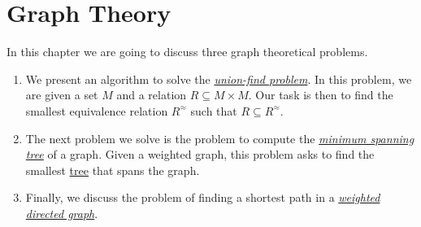 \chapter{Graph Theory}
In this chapter we are going to discuss three graph theoretical problems.
\begin{enumerate}
\item We present an algorithm to solve the 
      \href{https://en.wikipedia.org/wiki/Disjoint-set_data_structure}{\emph{union-find problem}}.
      In this problem, we are given a set $M$ and a relation $R \subseteq M \times M$.  Our task is
      then to find the smallest equivalence relation $R^\approx$ such that $R \subseteq R^\approx$.  
\item The next problem we solve is the problem to compute the
      \href{https://en.wikipedia.org/wiki/Minimum_spanning_tree}{\emph{minimum spanning tree}}
      of a graph.  Given a weighted graph, this problem asks to find the smallest 
      \href{https://en.wikipedia.org/wiki/Tree_(data_structure)}{tree} that 
      spans the graph.
\item Finally, we discuss the problem of finding a shortest path in a 
      \href{https://en.wikipedia.org/wiki/Directed_graph}{\emph{weighted directed graph}}.
\end{enumerate}

